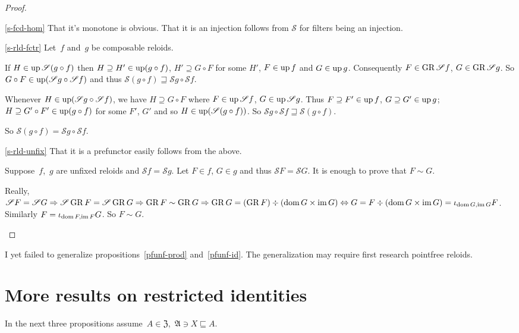 \begin{proof}
~
\begin{widedisorder}
\item[\ref{s-fcd-hom}] That it's monotone is obvious.
That it is an injection follows from $\mathscr{S}$ for filters
being an injection.

\item[\ref{s-rld-fctr}]
Let~$f$ and~$g$ be composable reloids.

If $H\in\operatorname{up}\mathscr{S}(g\circ f)$ then
$H\supseteq H'\in\operatorname{up}(g\circ f)$,
$H'\supseteq G\circ F$ for some $H'$,
$F\in\operatorname{up} f$ and $G\in\operatorname{up} g$. Consequently
$F\in\operatorname{GR}\mathscr{S}f$, $G\in\operatorname{GR}\mathscr{S}g$. So
$G\circ F\in\operatorname{up}(\mathscr{S}g\circ\mathscr{S}f)$
and thus
$\mathscr{S}(g\circ f)\sqsupseteq
\mathscr{S}g\circ\mathscr{S}f$.

Whenever $H\in\operatorname{up}(\mathscr{S}g\circ\mathscr{S}f)$,
we have
$H\supseteq G\circ F$ where $F\in\operatorname{up}\mathscr{S}f$,
$G\in\operatorname{up}\mathscr{S}g$. Thus
$F\supseteq F'\in\operatorname{up} f$, $G\supseteq G'\in\operatorname{up} g$;
$H\supseteq G'\circ F'\in\operatorname{up}(g\circ f)$
for some $F'$, $G'$ and so
$H\in\operatorname{up}(\mathscr{S}(g\circ f))$. So
$\mathscr{S}g\circ\mathscr{S}f\sqsupseteq
\mathscr{S}(g\circ f)$.

So
$\mathscr{S}(g\circ f)=\mathscr{S}g\circ\mathscr{S}f$.

\item[\ref{s-rld-unfix}]
That it is a prefunctor easily follows from the above.

Suppose~$f$,~$g$ are unfixed reloids and
$\mathscr{S}f=\mathscr{S}g$.
Let $F\in f$, $G\in g$ and thus
$\mathscr{S}F=\mathscr{S}G$.
It is enough to prove that $F\sim G$.

Really, $\mathscr{S}F=\mathscr{S}G\Rightarrow
\mathscr{S}\operatorname{GR} F=\mathscr{S}\operatorname{GR} G\Rightarrow
\operatorname{GR} F\sim\operatorname{GR} G\Rightarrow
\operatorname{GR} G=(\operatorname{GR} F)\div(\operatorname{dom} G\times\operatorname{im} G)\Leftrightarrow
G=F\div(\operatorname{dom} G\times\operatorname{im} G)=
\iota_{\operatorname{dom} G,\operatorname{im} G}F$.
Similarly $F=\iota_{\operatorname{dom} F,\operatorname{im} F}G$.
So $F\sim G$.
\end{widedisorder}
\end{proof}

I yet failed to generalize propositions~\ref{pfunf-prod}
and~\ref{pfunf-id}. The generalization may require first
research pointfree reloids.

\section{More results on restricted identities}

In the next three propositions
assume~$A\in\mathfrak{Z}$,~$\mathfrak{A}\ni X\sqsubseteq A$.

